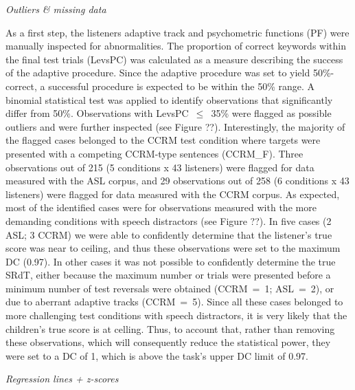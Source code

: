 \documentclass[a4paper, twoside]{templates/ociamthesis}
\begin{document}
\colorbox[HTML]{CCCCFF}{\emph{Outliers \& missing data}}

As a first step, the listeners adaptive track and psychometric functions (PF) were manually inspected for abnormalities. The proportion of correct keywords within the final test trials (LevsPC) was calculated as a measure describing the success of the adaptive procedure. Since the adaptive procedure was set to yield 50\%-correct, a successful procedure is expected to be within the 50\% range. A binomial statistical test was applied to identify observations that significantly differ from 50\%. Observations with LevsPC~\(\leq\)~35\% were flagged as possible outliers and were further inspected (see Figure ??). Interestingly, the majority of the flagged cases belonged to the CCRM test condition where targets were presented with a competing CCRM-type sentences (CCRM\_F). Three observations out of 215 (5 conditions x 43 listeners) were flagged for data measured with the ASL corpus, and 29 observations out of 258 (6 conditions x 43 listeners) were flagged for data measured with the CCRM corpus. As expected, most of the identified cases were for observations measured with the more demanding conditions with speech distractors (see Figure ??). In five cases (2 ASL; 3 CCRM) we were able to confidently determine that the listener's true score was near to ceiling, and thus these observations were set to the maximum DC (0.97). In other cases it was not possible to confidently determine the true SRdT, either because the maximum number or trials were presented before a minimum number of test reversals were obtained (CCRM~=~1; ASL~=~2), or due to aberrant adaptive tracks (CCRM~=~5). Since all these cases belonged to more challenging test conditions with speech distractors, it is very likely that the children's true score is at celling. Thus, to account that, rather than removing these observations, which will consequently reduce the statistical power, they were set to a DC of 1, which is above the task's upper DC limit of 0.97.

\colorbox[HTML]{CCCCFF}{\emph{Regression lines + z-scores}}
\end{document}
